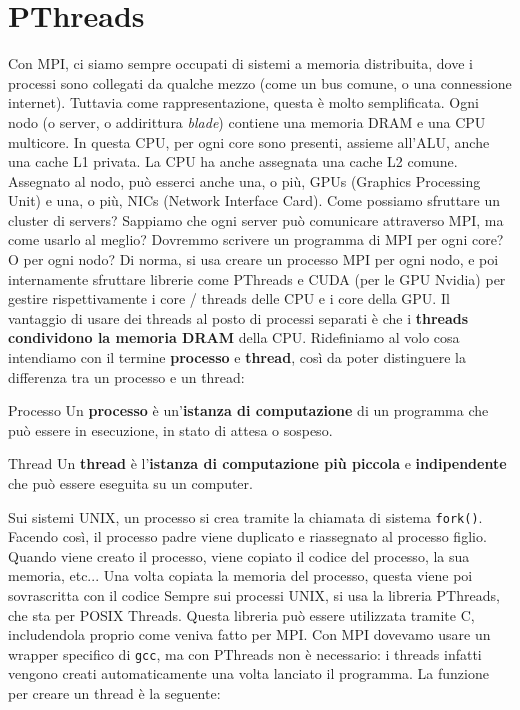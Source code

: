 \chapter{PThreads}
Con MPI, ci siamo sempre occupati di sistemi a memoria distribuita, dove i processi sono collegati da qualche mezzo (come un bus comune, o una connessione internet). Tuttavia come rappresentazione, questa è molto semplificata.
\nwl
Ogni nodo (o server, o addirittura \textit{blade}) contiene una memoria DRAM e una CPU multicore. In questa CPU, per ogni core sono presenti, assieme all'ALU, anche una cache L1 privata. La CPU ha anche assegnata una cache L2 comune. Assegnato al nodo, può esserci anche una, o più, GPUs (Graphics Processing Unit) e una, o più, NICs (Network Interface Card).
\nwl
Come possiamo sfruttare un cluster di servers? Sappiamo che ogni server può comunicare attraverso MPI, ma come usarlo al meglio? Dovremmo scrivere un programma di MPI per ogni core? O per ogni nodo?
\nwl
Di norma, si usa creare un processo MPI per ogni nodo, e poi internamente sfruttare librerie come PThreads e CUDA (per le GPU Nvidia) per gestire rispettivamente i core / threads delle CPU e i core della GPU. Il vantaggio di usare dei threads al posto di processi separati è che i \textbf{threads condividono la memoria DRAM} della CPU.
\nwl
Ridefiniamo al volo cosa intendiamo con il termine \textbf{processo} e \textbf{thread}, così da poter distinguere la differenza tra un processo e un thread:

\begin{definition}{Processo}
    Un \textbf{processo} è un'\textbf{istanza di computazione} di un programma che può essere in esecuzione, in stato di attesa o sospeso.
\end{definition}

\begin{definition}{Thread}
    Un \textbf{thread} è l'\textbf{istanza di computazione più piccola} e \textbf{indipendente} che può essere eseguita su un computer.
\end{definition}

Sui sistemi UNIX, un processo si crea tramite la chiamata di sistema \verb|fork()|. Facendo così, il processo padre viene duplicato e riassegnato al processo figlio. Quando viene creato il processo, viene copiato il codice del processo, la sua memoria, etc... Una volta copiata la memoria del processo, questa viene poi sovrascritta con il codice
\nwl
Sempre sui processi UNIX, si usa la libreria PThreads, che sta per POSIX Threads. Questa libreria può essere utilizzata tramite C, includendola proprio come veniva fatto per MPI.
\nwl
Con MPI dovevamo usare un wrapper specifico di \verb|gcc|, ma con PThreads non è necessario: i threads infatti vengono creati automaticamente una volta lanciato il programma. La funzione per creare un thread è la seguente:

